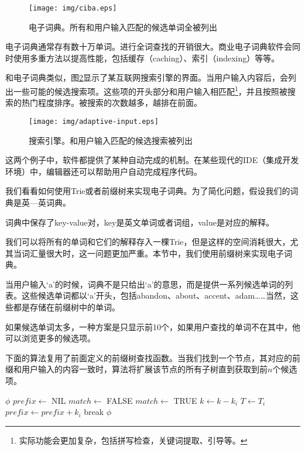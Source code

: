 \documentclass[UTF8]{article}
\begin{document}
\begin{figure}[htbp]
  \centering
  \texttt{[image: img/ciba.eps]}
  \caption{电子词典。所有和用户输入匹配的候选单词全被列出}
  \label{fig:e-dict}
\end{figure}

电子词典通常存有数十万单词。进行全词查找的开销很大。商业电子词典软件会同时使用多重方法以提高性能，包括缓存（caching）、索引（indexing）等等。

和电子词典类似，图\ref{fig:word-completion}显示了某互联网搜索引擎的界面。当用户输入内容后，会列出一些可能的候选搜索项。这些项的开头部分和用户输入相匹配\footnote{实际功能会更加复杂，包括拼写检查，关键词提取、引导等。}，并且按照被搜索的热门程度排序。被搜索的次数越多，越排在前面。

\begin{figure}[htbp]
  \centering
  \texttt{[image: img/adaptive-input.eps]}
  \caption{搜索引擎。和用户输入匹配的候选搜索被列出}
  \label{fig:word-completion}
\end{figure}

这两个例子中，软件都提供了某种自动完成的机制。在某些现代的IDE（集成开发环境）中，编辑器还可以帮助用户自动完成程序代码。

我们看看如何使用Trie或者前缀树来实现电子词典。为了简化问题，假设我们的词典是英—英词典。

词典中保存了key-value对，key是英文单词或者词组，value是对应的解释。

我们可以将所有的单词和它们的解释存入一棵Trie，但是这样的空间消耗很大，尤其当词汇量很大时，这一问题更加严重。本节中，我们使用前缀树来实现电子词典。

当用户输入‘a’的时候，词典不是只给出‘a’的意思，而是提供一系列候选单词的列表。这些候选单词都以‘a’开头，包括abandon、about、accent、adam……当然，这些都是存储在前缀树中的单词。

如果候选单词太多，一种方案是只显示前10个，如果用户查找的单词不在其中，他可以浏览更多的候选项。

下面的算法复用了前面定义的前缀树查找函数。当我们找到一个节点，其对应的前缀和用户输入的内容一致时，算法将扩展该节点的所有子树直到获取到前$n$个候选项。

\begin{algorithmic}[1]
     \State \Return $\phi$
  \EndIf
  \State $prefix \gets$ NIL
  \Repeat
    \State $match \gets$ FALSE
        \State \Return {}
      \EndIf
        \State $match \gets$ TRUE
        \State $k \gets k - k_i$
        \State $T \gets T_i$
        \State $prefix \gets prefix + k_i$
        \State break
      \EndIf
    \EndFor
  \State \Return $\phi$
\EndFunction
\end{algorithmic}
\end{document}
